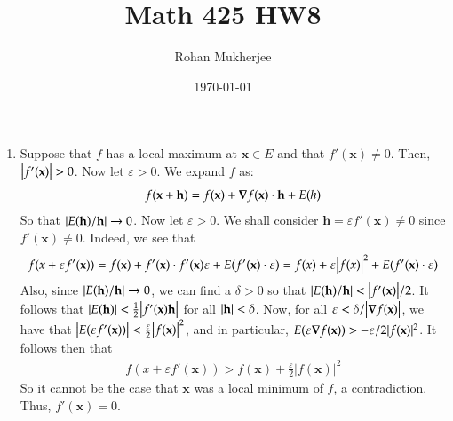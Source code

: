 \documentclass[12pt]{article}
\title{Math 425 HW8}
\date{\today}
\author{Rohan Mukherjee}
\theoremstyle{definitionstyle}
\def \ve{\varepsilon}
\begin{document}
	\maketitle
	\begin{enumerate}[leftmargin=\labelsep]
		\item Suppose that $f$ has a local maximum at $\textbf{x} \in E$ and that $f'(\textbf{x}) \neq 0$. Then, $\qty|f'(\textbf{x})| > 0$. Now let $\ve > 0$. We expand $f$ as:
		\begin{align*}
			f(\textbf{x}+\textbf{h}) = f(\textbf{x}) + \grad{f}(\mathbf{x}) \cdot \textbf{h} + E(h)
		\end{align*}
		So that $\qty|{E(\textbf{h})/\textbf{h}}| \to 0$. Now let $\ve > 0$. We shall consider $\textbf{h} = \ve f'(\mathbf{x}) \neq 0$ since $f'(\mathbf{x}) \neq 0$. Indeed, we see that 
		\begin{align*}
			f(x+\ve f'(\mathbf{x})) = f(\textbf{x}) + f'(\mathbf{x}) \cdot f'(\mathbf{x}) \ve + E(f'(\mathbf{x}) \cdot \ve) = f(x) + \ve\qty|f(x)|^2 + E(f'(\mathbf{x}) \cdot \ve)
		\end{align*}
		Also, since $\qty|E(\textbf{h})/\textbf{h}| \to 0$, we can find a $\delta > 0$ so that $\qty|E(\textbf{h})/\textbf{h}| < \qty|f'(\textbf{x})|/2$. It follows that $\qty|E(\textbf{h})| < \frac12\qty|f'(\textbf{x}) \textbf{h}|$ for all $\qty|\textbf{h}| < \delta$. Now, for all $\ve < \delta / \qty|\grad{f}(\textbf{x})|$, we have that $\qty|E(\ve f'(\textbf{x}))| < \frac{\ve}{2} \qty|f(\textbf{x})|^2$, and in particular, $E(\ve \grad{f}(\textbf{x})) > -\ve/2 |f(\textbf{x})|^2$. It follows then that
		\begin{align*}
			f(x+\ve f'(\textbf{x})) > f(\textbf{x}) + \frac{\ve}2 |f(\textbf{x})|^2
		\end{align*}
		So it cannot be the case that $\textbf{x}$ was a local minimum of $f$, a contradiction. Thus, $f'(\textbf{x}) = 0$.
		

\end{enumerate}
\end{document}
